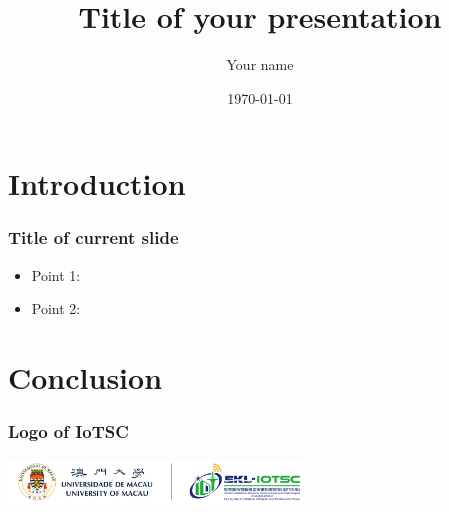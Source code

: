 \documentclass{beamer}
\begin{document}
\title{Title of your presentation}
\author{Your name}
\date{\today}

\begin{frame}
  \maketitle
\end{frame}

\begin{frame}
  \tableofcontents
\end{frame}

\section{Introduction}

\begin{frame}
  \frametitle{Title of current slide}

  \begin{itemize}
  \item Point 1:
  \item Point 2:     
  \end{itemize}
  
\end{frame}


\section{Conclusion}

\begin{frame}
  \frametitle{Logo of IoTSC}

  \includegraphics[width=0.6\textwidth]{pics/iotscUMLogo.png}
  
\end{frame}
\end{document}

